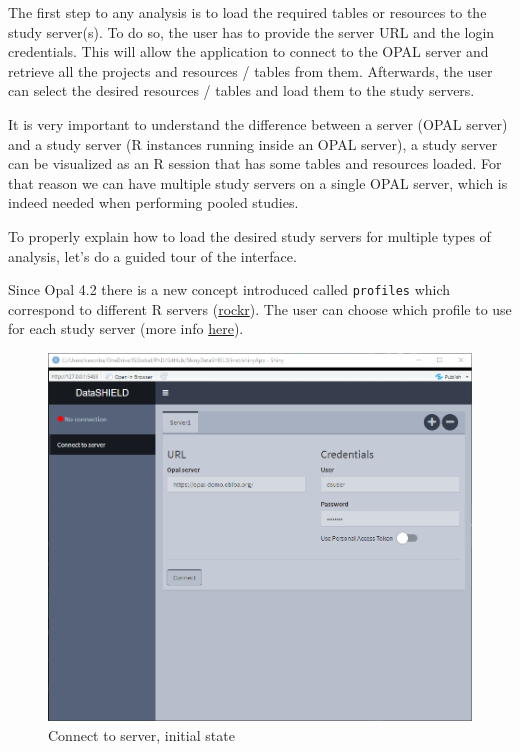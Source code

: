 \documentclass[
]{book}
\begin{document}
The first step to any analysis is to load the required tables or resources to the study server(s). To do so, the user has to provide the server URL and the login credentials. This will allow the application to connect to the OPAL server and retrieve all the projects and resources / tables from them. Afterwards, the user can select the desired resources / tables and load them to the study servers.

It is very important to understand the difference between a server (OPAL server) and a study server (R instances running inside an OPAL server), a study server can be visualized as an R session that has some tables and resources loaded. For that reason we can have multiple study servers on a single OPAL server, which is indeed needed when performing pooled studies.

To properly explain how to load the desired study servers for multiple types of analysis, let's do a guided tour of the interface.

Since Opal 4.2 there is a new concept introduced called \texttt{profiles} which correspond to different R servers (\href{https://rockdoc.obiba.org/en/latest/}{rockr}). The user can choose which profile to use for each study server (more info \protect\hyperlink{profiles}{here}).

\begin{figure}

{\centering \includegraphics[width=12.71in]{images/data_entry1} 

}

\caption{Connect to server, initial state}\label{fig:dataentry1}
\end{figure}
\end{document}
